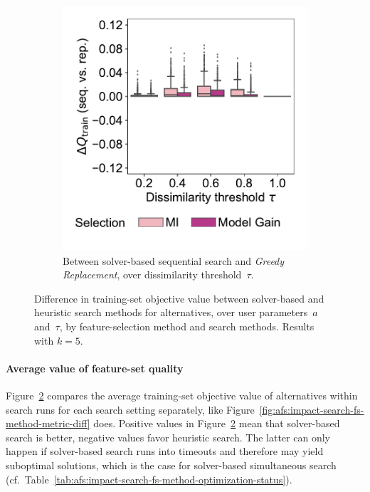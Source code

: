 \documentclass{article}
\theoremstyle{definition}
\begin{document}
\begin{figure}[p]
\begin{subfigure}[t]{0.48\textwidth}
		\includegraphics[width=\textwidth, trim=15 30 15 15, clip]{plots/afs-impact-search-heuristics-metric-diff-seq-tau.pdf}
		\caption{
			Between solver-based sequential search and \emph{Greedy Replacement}, over dissimilarity threshold~$\tau$.
		}
		\label{fig:afs:impact-search-heuristics-metric-diff-seq-tau}
	\end{subfigure}
	\caption{
		Difference in training-set objective value between solver-based and heuristic search methods for alternatives, over user parameters~$a$ and~$\tau$, by feature-selection method and search methods.
		Results with $k=5$.
	}
	\label{fig:afs:impact-search-heuristics-metric-diff}
\end{figure}

\paragraph{Average value of feature-set quality}

Figure~\ref{fig:afs:impact-search-heuristics-metric-diff} compares the average training-set objective value of alternatives within search runs for each search setting separately, like Figure~\ref{fig:afs:impact-search-fs-method-metric-diff} does.
Positive values in Figure~\ref{fig:afs:impact-search-heuristics-metric-diff} mean that solver-based search is better, negative values favor heuristic search.
The latter can only happen if solver-based search runs into timeouts and therefore may yield suboptimal solutions, which is the case for solver-based simultaneous search (cf.~Table~\ref{tab:afs:impact-search-fs-method-optimization-status}).
\end{document}

